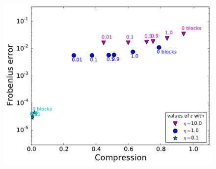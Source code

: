 \begin{frame}
\begin{figure}
\begin{minipage}[c]{.3\linewidth}
\end{minipage}
\begin{minipage}[c]{.6\linewidth}
\includegraphics[width=\textwidth]{../images/graphe_compare_output_compression_18_08_2016matrice1363Fracs.pdf}
\end{minipage}
\end{figure}


\end{frame}

